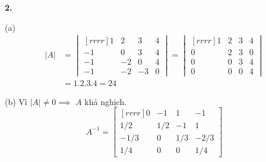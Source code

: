 \documentclass{article}
\begin{document}
    \begin{minipage}[t]{0.35\linewidth}
    \textbf{2.}

    (a) 
    \begin{equation*}
        \begin{split}
            |A| &=  \begin{vmatrix}[rrrr]
                1 & 2 & 3 & 4 \\
                -1 & 0 & 3  & 4 \\
                -1 & -2 & 0 & 4 \\
                -1 & -2 & -3 & 0 
            \end{vmatrix} =
            \begin{vmatrix}[rrrr]
                1 & 2 & 3 & 4 \\
                0 & 2 & 3 & 0 \\
                0 & 0 & 3 & 4 \\
                0 & 0 & 0 & 4
            \end{vmatrix} \\
            &= 1.2.3.4 = 24
        \end{split}
    \end{equation*}


    (b)
    Vì $|A| \ne 0 \implies$ $A$ khả nghịch.
    \[A^{-1} = \begin{bmatrix}[rrrr]
        0 & -1 & 1 & -1 \\
        1/2 & 1/2 & -1 & 1 \\
        -1/3 & 0 & 1/3 & -2/3 \\
        1/4 & 0 & 0 & 1/4 
    \end{bmatrix} \]

        
    \end{minipage}
\end{document}
